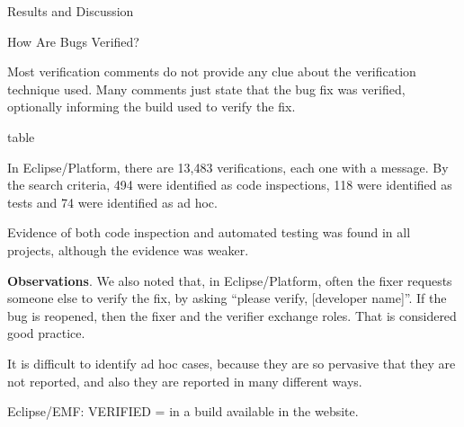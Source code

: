 \begin{section}{Results and Discussion}
\begin{subsection}{How Are Bugs Verified?}

  Most verification comments do not provide any clue about the verification technique used. Many comments just state that the bug fix was verified, optionally informing the build used to verify the fix. 

	\TODO table


  In Eclipse/Platform, there are 13,483 verifications, each one with a message. By the search criteria, 494 were identified as code inspections, 118 were identified as tests and 74 were identified as ad hoc.

	Evidence of both code inspection and automated testing was found in all projects, although the evidence was weaker.
	
	\textbf{Observations}.
  We also noted that, in Eclipse/Platform, often the fixer requests someone else to verify the fix, by asking ``please verify, [developer name]''. If the bug is reopened, then the fixer and the verifier exchange roles. That is considered good practice.

  It is difficult to identify ad hoc cases, because they are so pervasive that they are not reported, and also they are reported in many different ways.

	\TODO Eclipse/EMF: VERIFIED = in a build available in the website.




\end{subsection}
\end{section}
